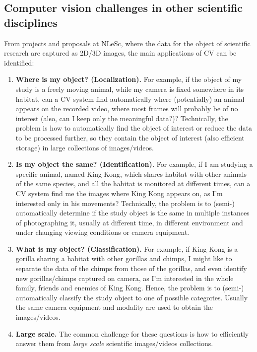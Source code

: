 \subsection{Computer vision challenges in other scientific disciplines}
From projects and proposals at NLeSc, where the data for the object of scientific research are captured as 2D/3D images, the main applications of CV can be identified:
\begin{enumerate}
\item {\bf Where is my object? (Localization).} For example, if the object of my study is a freely moving animal, while my camera is fixed somewhere in its habitat, can a CV system find automatically where (potentially) an animal appears on the recorded video, where most frames will probably be of no interest (also, can I keep only the meaningful data?)? Technically, the problem is how to automatically find the object of interest or reduce the data to be processed further, so they contain the object of interest (also efficient storage) in large collections of images/videos.
\item {\bf Is my object the same? (Identification).} For example, if I am studying a specific animal, named King Kong, which shares habitat with other animals of the same species, and all the habitat is monitored at different times, can a CV system find me the images where King Kong appears on, as I'm interested only in his movements? Technically, the problem is to (semi-) automatically determine if the study object is the same in multiple instances of photographing it, usually at different time, in different environment and under changing viewing conditions or camera equipment.
\item {\bf What is my object? (Classification).} For example, if King Kong is a gorilla sharing a habitat with other gorillas and chimps, I might like to separate the data of the chimps from those of the gorillas, and even identify new gorillas/chimps captured on camera, as I'm interested in the whole family, friends and enemies of King Kong. Hence, the problem is to (semi-) automatically classify the study object to one of possible categories. Usually the same camera equipment and modality are used to obtain the images/videos.
\item{\bf Large scale.} The common challenge for these questions is how to efficiently answer them from {\em large scale} scientific images/videos collections.
\end{enumerate}

